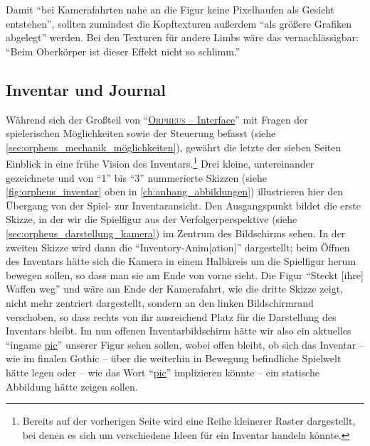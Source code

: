 \documentclass[a5paper,pagesize,numbers=noenddot]{scrbook}
\begin{document}
Damit \enquote{bei Kamerafahrten nahe an die Figur keine Pixelhaufen als Gesicht entstehen}, sollten zumindest die Kopftexturen außerdem \enquote{als größere Grafiken abgelegt} werden.
Bei den Texturen für andere Limbs wäre das vernachlässigbar: \enquote{Beim Oberkörper ist dieser Effekt nicht so schlimm.}


\subsection{Inventar und Journal}\label{sec:orpheus_darstellung_inventar}
Während sich der Großteil von \enquote{\uline{\textsc{Orpheus} -- Interface}} mit Fragen der spielerischen Möglichkeiten sowie der Steuerung befasst (siehe \autoref{sec:orpheus_mechanik_möglichkeiten}), gewährt die letzte der sieben Seiten Einblick in eine frühe Vision des Inventars.\footnote{Bereits auf der vorherigen Seite wird eine Reihe kleinerer Raster dargestellt, bei denen es sich um verschiedene Ideen für ein Inventar handeln könnte.}
Drei kleine, untereinander gezeichnete und von \enquote{1} bis \enquote{3} nummerierte Skizzen (siehe \autoref{fig:orpheus_inventar} oben in \autoref{ch:anhang_abbildungen}) illustrieren hier den Übergang von der Spiel- zur Inventar\-ansicht.
Den Ausgangspunkt bildet die erste Skizze, in der wir die Spielfigur aus der Verfolgerperspektive (siehe \autoref{sec:orpheus_darstellung_kamera}) im Zentrum des Bildschirms sehen.
In der zweiten Skizze wird dann die \enquote{Inventory-Anim[ation]} dargestellt; beim Öffnen des Inventars hätte sich die Kamera in einem Halbkreis um die Spielfigur herum bewegen sollen, so dass man sie am Ende von vorne sieht.
Die Figur \enquote{Steckt [ihre] Waffen weg} und wäre am Ende der Kamerafahrt, wie die dritte Skizze zeigt, nicht mehr zentriert dargestellt, sondern an den linken Bildschirmrand verschoben, so dass rechts von ihr ausreichend Platz für die Darstellung des Inventars bleibt.
Im nun offenen Inventarbildschirm hätte wir also ein aktuelles \enquote{ingame \uline{pic}} unserer Figur sehen sollen, wobei offen bleibt, ob sich das Inventar -- wie im finalen Gothic -- über die weiterhin in Bewegung befindliche Spielwelt hätte legen oder -- wie das Wort \enquote{\uline{pic}} implizieren könnte -- ein statische Abbildung hätte zeigen sollen.
\end{document}
